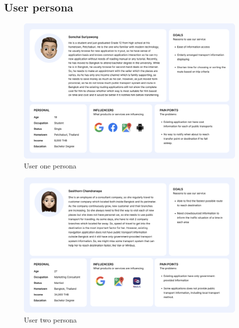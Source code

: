 \subsection{User persona}
\begin{figure}[!h]
    \centering
    \includegraphics[width=1\linewidth]{chapter3/user-persona-1.png}
    \caption{User one persona}    
    \label{fig:User one persona}
\end{figure}
\begin{figure}[!h]
    \centering
    \includegraphics[width=1\linewidth]{chapter3/user-persona-2.png}
    \caption{User two persona}
    \label{fig:User two persona}
\end{figure}
